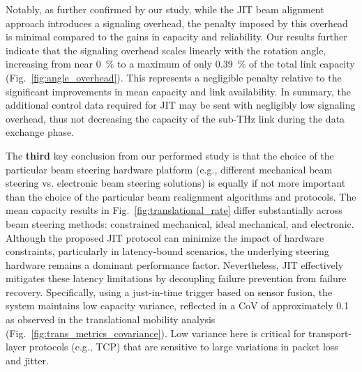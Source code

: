 \documentclass[fleqn,10pt]{wlscirep}
\begin{document}
Notably, as further confirmed by our study, while the JIT beam alignment approach introduces a signaling overhead, the penalty imposed by this overhead is minimal compared to the gains in capacity and reliability. Our results further indicate that the signaling overhead scales linearly with the rotation angle, increasing from near \SI{0}{\percent} to a maximum of only \SI{0.39}{\percent} of the total link capacity (Fig.~\ref{fig:angle_overhead}). This represents a negligible penalty relative to the significant improvements in mean capacity and link availability. In summary, the additional control data required for JIT may be sent with negligibly low signaling overhead, thus not decreasing the capacity of the sub-THz link during the data exchange phase.

The \textbf{third} key conclusion from our performed study is that the choice of the particular beam steering hardware platform (e.g., different mechanical beam steering vs. electronic beam steering solutions) is equally if not more important than the choice of the particular beam realignment algorithms and protocols. The mean capacity results in Fig.~\ref{fig:translational_rate} differ substantially across beam steering methods: constrained mechanical, ideal mechanical, and electronic. Although the proposed JIT protocol can minimize the impact of hardware constraints, particularly in latency-bound scenarios, the underlying steering hardware remains a dominant performance factor. Nevertheless, JIT effectively mitigates these latency limitations by decoupling failure prevention from failure recovery. Specifically, using a just-in-time trigger based on sensor fusion, the system maintains low capacity variance, reflected in a CoV of approximately 0.1 as observed in the translational mobility analysis (Fig.~\ref{fig:trans_metrics_covariance}). Low variance here is critical for transport-layer protocols (e.g., TCP) that are sensitive to large variations in packet loss and jitter\cite{Jacobson1988}.
\end{document}
